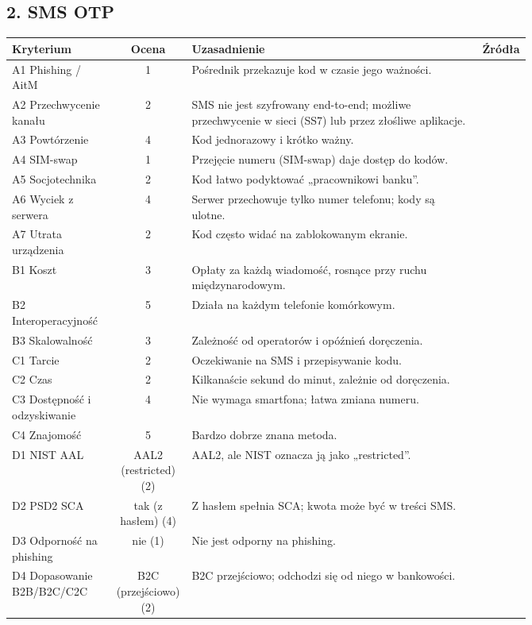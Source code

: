 \subsection*{2. SMS OTP}
\begingroup\small
\begin{longtable}{@{}p{0.2\linewidth}c p{0.56\linewidth}l@{}}
\toprule
Kryterium & Ocena & Uzasadnienie & Źródła \\
\midrule
\endhead
A1 Phishing / AitM & 1 & Pośrednik przekazuje kod w czasie jego ważności. & \cite{A1,A3} \\
A2 Przechwycenie kanału & 2 & SMS nie jest szyfrowany end-to-end; możliwe przechwycenie w sieci (SS7) lub przez złośliwe aplikacje. & \cite{A3,N1} \\
A3 Powtórzenie & 4 & Kod jednorazowy i krótko ważny. & \cite{N1,P7} \\
A4 SIM-swap & 1 & Przejęcie numeru (SIM-swap) daje dostęp do kodów. & \cite{X2,A3,X8} \\
A5 Socjotechnika & 2 & Kod łatwo podyktować „pracownikowi banku”. & \cite{A3,P9} \\
A6 Wyciek z serwera & 4 & Serwer przechowuje tylko numer telefonu; kody są ulotne. & \cite{N1} \\
A7 Utrata urządzenia & 2 & Kod często widać na zablokowanym ekranie. & \cite{A3} \\
B1 Koszt & 3 & Opłaty za każdą wiadomość, rosnące przy ruchu międzynarodowym. & \cite{P7,A3} \\
B2 Interoperacyjność & 5 & Działa na każdym telefonie komórkowym. & \cite{P7,P8} \\
B3 Skalowalność & 3 & Zależność od operatorów i opóźnień doręczenia. & \cite{P7} \\
C1 Tarcie & 2 & Oczekiwanie na SMS i przepisywanie kodu. & \cite{P8,P12} \\
C2 Czas & 2 & Kilkanaście sekund do minut, zależnie od doręczenia. & \cite{P8} \\
C3 Dostępność i odzyskiwanie & 4 & Nie wymaga smartfona; łatwa zmiana numeru. & \cite{P7,P9} \\
C4 Znajomość & 5 & Bardzo dobrze znana metoda. & \cite{P8,P9} \\
D1 NIST AAL & AAL2 (restricted) (2) & AAL2, ale NIST oznacza ją jako „restricted”. & \cite{N1} \\
D2 PSD2 SCA & tak (z hasłem) (4) & Z hasłem spełnia SCA; kwota może być w treści SMS. & \cite{N3} \\
D3 Odporność na phishing & nie (1) & Nie jest odporny na phishing. & \cite{N1,A1} \\
D4 Dopasowanie B2B/B2C/C2C & B2C (przejściowo) (2) & B2C przejściowo; odchodzi się od niego w bankowości. & \cite{N1,R2} \\
\bottomrule
\end{longtable}
\endgroup

